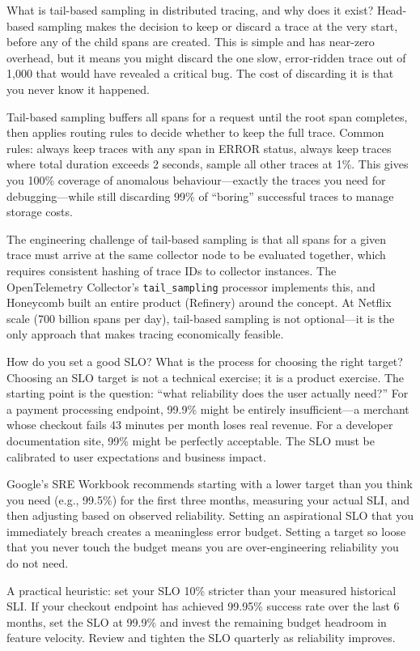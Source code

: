 \documentclass[11pt,a4paper]{article}
\begin{document}
\begin{curiobox}{What is tail-based sampling in distributed tracing, and why does it exist?}
  Head-based sampling makes the decision to keep or discard a trace at the very start, before any of the child spans are created. This is simple and has near-zero overhead, but it means you might discard the one slow, error-ridden trace out of 1,000 that would have revealed a critical bug. The cost of discarding it is that you never know it happened.

  Tail-based sampling buffers all spans for a request until the root span completes, then applies routing rules to decide whether to keep the full trace. Common rules: always keep traces with any span in ERROR status, always keep traces where total duration exceeds 2 seconds, sample all other traces at 1\%. This gives you 100\% coverage of anomalous behaviour---exactly the traces you need for debugging---while still discarding 99\% of ``boring'' successful traces to manage storage costs.

  The engineering challenge of tail-based sampling is that all spans for a given trace must arrive at the same collector node to be evaluated together, which requires consistent hashing of trace IDs to collector instances. The OpenTelemetry Collector's \texttt{tail\_sampling} processor implements this, and Honeycomb built an entire product (Refinery) around the concept. At Netflix scale (700 billion spans per day), tail-based sampling is not optional---it is the only approach that makes tracing economically feasible.
\end{curiobox}

\begin{curiobox}{How do you set a good SLO? What is the process for choosing the right target?}
  Choosing an SLO target is not a technical exercise; it is a product exercise. The starting point is the question: ``what reliability does the user actually need?'' For a payment processing endpoint, 99.9\% might be entirely insufficient---a merchant whose checkout fails 43 minutes per month loses real revenue. For a developer documentation site, 99\% might be perfectly acceptable. The SLO must be calibrated to user expectations and business impact.

  Google's SRE Workbook recommends starting with a lower target than you think you need (e.g., 99.5\%) for the first three months, measuring your actual SLI, and then adjusting based on observed reliability. Setting an aspirational SLO that you immediately breach creates a meaningless error budget. Setting a target so loose that you never touch the budget means you are over-engineering reliability you do not need.

  A practical heuristic: set your SLO 10\% stricter than your measured historical SLI. If your checkout endpoint has achieved 99.95\% success rate over the last 6 months, set the SLO at 99.9\% and invest the remaining budget headroom in feature velocity. Review and tighten the SLO quarterly as reliability improves.
\end{curiobox}
\end{document}
